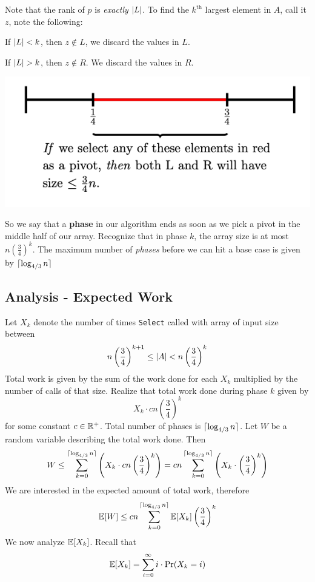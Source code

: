\documentclass[11pt]{article}
\begin{document}
Note that the rank of \(p\) is \emph{exactly} \(\abs{L}\). To find the \(k^{\text{th}}\) largest
element in \(A\), call it \(z\), note the following:
\begin{center}
If \(\abs{L}<k\), then \(z\notin L\), we discard the values in \(L\).

If \(\abs{L}>k\), then \(z\notin R\). We discard the values in \(R\).
\end{center}

\begin{center}
\includegraphics[width=.7\textwidth]{../images/cme323/2.png}
\label{}
\end{center}

So we say that a \textbf{phase} in our algorithm ends as soon as we pick a pivot in the middle half of
our array. Recognize that in phase \(k\), the array size is at
most \(n\left( \frac{3}{4} \right)^k\). The maximum number of \emph{phases} before we can hit a base
case is given by \(\lceil \log_{4/3}n \rceil\)
\subsection{Analysis - Expected Work}
\label{sec:org66d830e}
Let \(X_k\) denote the number of times \texttt{Select} called with array of input size between
\begin{equation*}
n\left( \frac{3}{4} \right)^{k+1}\le\abs{A}<n\left( \frac{3}{4} \right)^k
\end{equation*}
Total work is given by the sum of the work done for each \(X_k\) multiplied by the number of
calls of that size. Realize that total work done during phase \(k\) given by
\begin{equation*}
X_k\cdot cn\left( \frac{3}{4} \right)^k
\end{equation*}
for some constant \(c\in\mathbb{R}^+\). Total number of phases is \(\lceil \log_{4/3}n \rceil\). Let \(W\) be a
random variable describing the total work done. Then
\begin{equation*}
W\le\sum_{k=0}^{\lceil \log_{4/3}n \rceil}\left( X_k\cdot cn\left( \frac{3}{4} \right)^k \right)=
cn\sum_{k=0}^{\lceil \log_{4/3}n \rceil}\left( X_k\cdot\left( \frac{3}{4} \right)^k \right)
\end{equation*}
We are interested in the expected amount of total work, therefore
\begin{equation*}
\mathbb{E}[W]\le cn\sum_{k=0}^{\lceil \log_{4/3}n \rceil}\mathbb{E}[X_k]\left( \frac{3}{4} \right)^k
\end{equation*}
We now analyze \(\mathbb{E}[X_k]\). Recall that
\begin{equation*}
\mathbb{E}[X_k]=\sum_{i=0}^\infty i\cdot\Pr(X_k=i)
\end{equation*}
\end{document}

